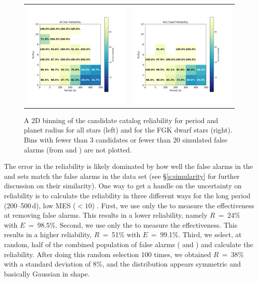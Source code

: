 \begin{figure}[htb]
\begin{center}
\begin{tabular}{cc}
\includegraphics[width=0.48\linewidth]{fig-AllReliabilityPR.png} &
\includegraphics[width=0.48\linewidth]{fig-FgkReliabilityPR.png}
\end{tabular}
\caption{A 2D binning of the candidate catalog reliability for period and planet radius for all stars (left) and for the FGK dwarf stars (right). Bins with fewer than 3 candidates or fewer than 20 simulated false alarms (from \invtce{} and \scrtce{}) are not plotted.}
\label{f:prReliability}
\end{center}
\end{figure}


The error in the reliability is likely dominated by how well the false alarms in the \scrtce{} and \invtce{} sets match the false alarms in the \opstce{} data set (see \S\ref{s:simularity} for further discussion on their similarity).  One way to get a handle on the uncertainty on reliability is to calculate the reliability in three different ways for the long period (200--500\,d), low MES ($<10$) .  First, we use only the  to measure the effectiveness at removing false alarms. This results in a lower reliability, namely $R$~=~24\% with $E$~=~98.5\%. Second, we use only the  to measure the effectiveness. This results in a higher reliability, $R$~=~51\% with $E$~=~99.1\%. Third, we select, at random, half of the combined population of false alarms (\scrtce{} and \invtce{}) and calculate the reliability. After doing this random selection 100 times, we obtained $R$~=~38\% with a standard deviation of 8\%, and the distribution appears symmetric and basically Gaussian in shape.  

